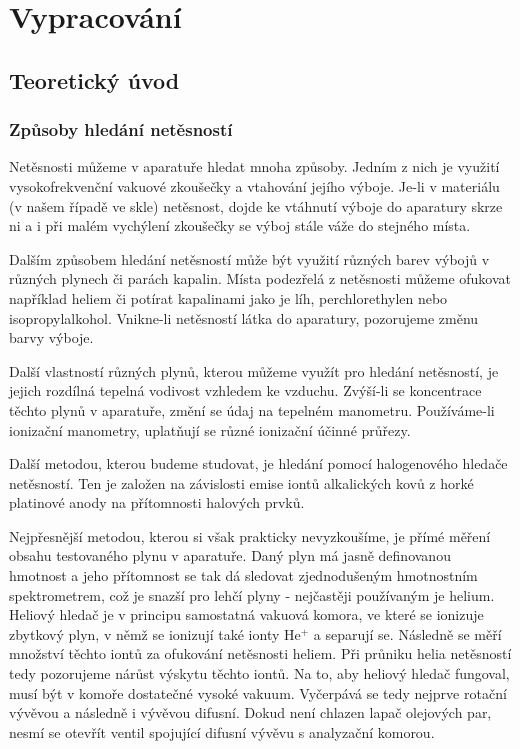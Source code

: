 \documentclass[english]{article}
\begin{document}
\section{Vypracování}
	\subsection{Teoretický úvod}
		\subsubsection{Způsoby hledání netěsností}
			Netěsnosti můžeme v aparatuře hledat mnoha způsoby. Jedním z nich je využití vysokofrekvenční vakuové zkoušečky a vtahování jejího výboje. Je-li v materiálu (v našem řípadě ve skle) netěsnost, dojde ke vtáhnutí výboje do aparatury skrze ni a i při malém vychýlení zkoušečky se výboj stále váže do stejného místa.
			
			Dalším způsobem hledání netěsností může být využití různých barev výbojů v různých plynech či parách kapalin. Místa podezřelá z netěsnosti můžeme ofukovat například heliem či potírat kapalinami jako je líh, perchlorethylen nebo isopropylalkohol. Vnikne-li netěsností látka do aparatury, pozorujeme změnu barvy výboje. 
			
			Další vlastností různých plynů, kterou můžeme využít pro hledání netěsností, je jejich rozdílná tepelná vodivost vzhledem ke vzduchu. Zvýší-li se koncentrace těchto plynů v aparatuře, změní se údaj na tepelném manometru. Používáme-li ionizační manometry, uplatňují se různé ionizační účinné průřezy.
		
			Další metodou, kterou budeme studovat, je hledání pomocí halogenového hledače netěsností. Ten je založen na závislosti emise iontů alkalických kovů z horké platinové anody na přítomnosti halových prvků. 
			
			Nejpřesnější metodou, kterou si však prakticky nevyzkoušíme, je přímé měření obsahu testovaného plynu v aparatuře. Daný plyn má jasně definovanou hmotnost a jeho přítomnost se tak dá sledovat zjednodušeným hmotnostním spektrometrem, což je snazší pro lehčí plyny - nejčastěji používaným je helium. Heliový hledač je v principu samostatná vakuová komora, ve které se ionizuje zbytkový plyn, v němž se ionizují také ionty $\mathrm{He^+}$ a separují se. Následně se měří množství těchto iontů za ofukování netěsnosti heliem. Při průniku helia netěsností tedy pozorujeme nárůst výskytu těchto iontů. Na to, aby heliový hledač fungoval, musí být v komoře dostatečné vysoké vakuum. Vyčerpává se tedy nejprve rotační vývěvou a následně i vývěvou difusní. Dokud není chlazen lapač olejových par, nesmí se otevřít ventil spojující difusní vývěvu s analyzační komorou.  
			
\end{document}
